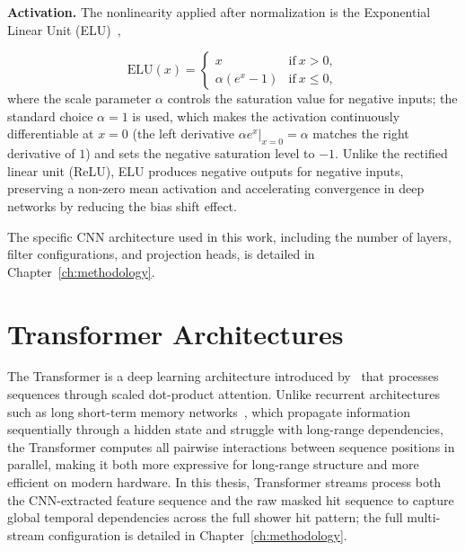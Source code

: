 \textbf{Activation.} The nonlinearity applied after normalization is the Exponential Linear Unit (ELU)~,

\begin{equation}
    \text{ELU}(x) = \begin{cases}
        x & \text{if} \ x >0 , \\
        \alpha(e^x - 1) & \text{if} \ x \leq 0,
    \end{cases}
\end{equation}
where the scale parameter $\alpha$ controls the saturation value for negative inputs; the standard choice $\alpha = 1$ is used, which makes the activation continuously differentiable at $x = 0$ (the left derivative $\alpha e^{x}|_{x=0} = \alpha$ matches the right derivative of $1$) and sets the negative saturation level to $-1$. Unlike the rectified linear unit (ReLU), ELU produces negative outputs for negative inputs, preserving a non-zero mean activation and accelerating convergence in deep networks by reducing the bias shift effect.

The specific CNN architecture used in this work, including the number of layers, filter configurations, and projection heads, is detailed in Chapter~\ref{ch:methodology}.

\section{Transformer Architectures}
\label{sec:transformer}

The Transformer is a deep learning architecture introduced by~ that processes sequences through scaled dot-product attention. Unlike recurrent architectures such as long short-term memory networks~, which propagate information sequentially through a hidden state and struggle with long-range dependencies, the Transformer computes all pairwise interactions between sequence positions in parallel, making it both more expressive for long-range structure and more efficient on modern hardware. In this thesis, Transformer streams process both the CNN-extracted feature sequence and the raw masked hit sequence to capture global temporal dependencies across the full shower hit pattern; the full multi-stream configuration is detailed in Chapter~\ref{ch:methodology}.

